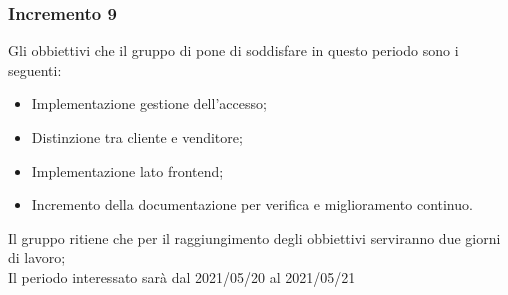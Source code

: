 \subsubsection{Incremento 9}
Gli obbiettivi che il gruppo di pone di soddisfare in questo periodo sono i seguenti:
\begin{itemize}
    \item Implementazione gestione dell'accesso;
    \item Distinzione tra cliente e venditore;
    \item Implementazione lato frontend;
    \item Incremento della documentazione per verifica e miglioramento continuo.
\end{itemize}
Il gruppo ritiene che per il raggiungimento degli obbiettivi serviranno due giorni di lavoro;\\
Il periodo interessato sarà dal 2021/05/20 al 2021/05/21


